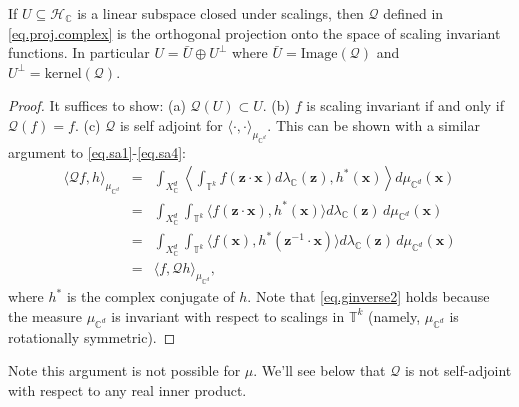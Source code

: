 \documentclass[twoside,11pt]{article}
\begin{document}
\begin{proposition}
If $U \subseteq \mathcal H_{\mathbb C}$ is a linear subspace closed under scalings, then $\mathcal Q$ defined in \eqref{eq.proj.complex} is the orthogonal projection onto the space of scaling invariant functions. In particular $U=\bar U \oplus U^{\perp}$ where $\bar U = \text{Image}(\mathcal Q)$  and $U^{\perp}=\text{kernel}(\mathcal Q)$. 
\end{proposition}
\begin{proof}
It suffices to show: (a) $\mathcal Q (U)\subset U$. (b) $f$ is scaling invariant if and only if $\mathcal Q(f)=f$. (c) $\mathcal Q$ is self adjoint for $\langle \cdot, \cdot \rangle_{\mu_{\mathbb C^d}}$. This can be shown with a similar argument to \eqref{eq.sa1}-\eqref{eq.sa4}:
\begin{eqnarray}
 \langle \mathcal Q f, h \rangle_{\mu_{\mathbb C^d}} &=& \int_{X_{\mathbb C}^d} \left\langle
  \int_{\mathbb T^k } f(\mathbf z \cdot  \mathbf x) 
  d\lambda_{\mathbb C}( \mathbf z) , 
  h^*(\mathbf x) \right \rangle d\mu_{\mathbb C^d}(\mathbf x)\\
&=& 
\int_{X_{\mathbb C}^d} \int_{\mathbb T^k } \langle  f(\mathbf z \cdot \mathbf x) , h^*(\mathbf x) \rangle  d\lambda_{\mathbb C}(\mathbf z) \, 
d\mu_{\mathbb C^d}(\mathbf x) \\
&=& \int_{X_{\mathbb C}^d} \int_{\mathbb T^k } \langle  f( \mathbf x) , 
h^*(\mathbf z^{-1}\cdot \mathbf x) \rangle  d\lambda_{\mathbb C}(\mathbf z) \, d\mu_{\mathbb C^d}(\mathbf x) \label{eq.ginverse2}\\
&=& \langle f,  \mathcal Q h \rangle_{\mu_{\mathbb C^d}},
\end{eqnarray}
where $h^*$ is the complex conjugate of $h$.
Note that \eqref{eq.ginverse2} holds because the measure $\mu_{\mathbb C^d}$ is invariant with respect to scalings in $\mathbb T^k$ (namely, $\mu_{\mathbb C^d}$ is rotationally symmetric). 
\end{proof}

Note this argument is not possible for $\mu$. We'll see below that $\mathcal Q$ is not self-adjoint with respect to any real inner product.
\end{document}
